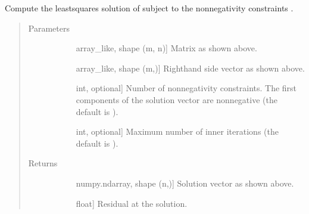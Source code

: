 \documentclass[letterpaper,10pt,english]{sphinxmanual}
\begin{document}
\begin{fulllineitems}
\label{\detokenize{refs/generated/cobyqa.linalg.nnls:cobyqa.linalg.nnls}}
\sphinxAtStartPar
Compute the least\sphinxhyphen{}squares solution of  subject to the
nonnegativity constraints .
\begin{quote}\begin{description}
\item[{Parameters}] \leavevmode\begin{description}
\item[{}] \leavevmode{[}array\_like, shape (m, n){]}
\sphinxAtStartPar
Matrix  as shown above.

\item[{}] \leavevmode{[}array\_like, shape (m,){]}
\sphinxAtStartPar
Right\sphinxhyphen{}hand side vector  as shown above.

\item[{}] \leavevmode{[}int, optional{]}
\sphinxAtStartPar
Number of nonnegativity constraints. The first  components of the
solution vector are nonnegative (the default is ).

\item[{}] \leavevmode{[}int, optional{]}
\sphinxAtStartPar
Maximum number of inner iterations (the default is ).

\end{description}

\item[{Returns}] \leavevmode\begin{description}
\item[{}] \leavevmode{[}numpy.ndarray, shape (n,){]}
\sphinxAtStartPar
Solution vector  as shown above.

\item[{}] \leavevmode{[}float{]}
\sphinxAtStartPar
Residual at the solution.


\end{description}
\end{description}
\end{quote}
\end{fulllineitems}
\end{document}
